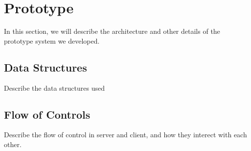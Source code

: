 \section{Prototype}
\label{sec:prototype}
	In this section, we will describe the architecture and other details of the prototype system we developed.
\subsection{Data Structures}
	 Describe the data structures used
\subsection{Flow of Controls}
	Describe the flow of control in server and client, and how they interect with each other.